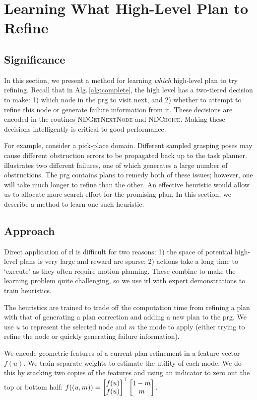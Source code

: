\section{Learning What High-Level Plan to Refine}
\subsection{Significance}
In this section, we present a method for learning \emph{which} high-level plan to try
refining. Recall that in Alg.\,\ref{alg:complete}, the high level has
a two-tiered decision to make: 1) which node in the {\sc prg} to visit
next, and 2) whether to attempt to refine this node or generate
failure information from it. These decisions are encoded in the
routines \textsc{NDGetNextNode} and \textsc{NDChoice}. Making these
decisions intelligently is critical to good performance. 

For example, consider a pick-place domain. Different sampled grasping
poses may cause different obstruction errors to be propagated back up to
the task planner.  illustrates two different
failures, one of which generates a large number of obstructions. The
{\sc prg} contains plans to remedy both of these issues; however, one
will take much longer to refine than the other. An effective heuristic
would allow us to allocate more search effort for the promising
plan. In this section, we describe a method to learn one such
heuristic.

\subsection{Approach}
Direct application of {\sc rl} is difficult for two reasons: 1) the
space of potential high-level plans is very large and reward are
sparse; 2) actions take a long time to `execute' as they often require
motion planning. These combine to make the learning problem quite
challenging, so we use {\sc irl} with expert demonstrations to
train heuristics.

The heuristics are trained to trade off the computation time from
refining a plan with that of generating a plan correction and adding a
new plan to the {\sc prg}. We use $u$ to represent the selected node
and $m$ the mode to apply (either trying to refine the node or
quickly generating failure information).

We encode geometric features of a current plan refinement in a feature
vector $f(u).$ We train separate weights to estimate the utility of
each mode. We do this by stacking two copies of the features and using
an indicator to zero out the top or bottom half: $f((u, m))
= \begin{bmatrix} f(u) \\ f(u) \end{bmatrix}^\top \begin{bmatrix} 1 -
  m \\ m \end{bmatrix}.\vspace{2pt}$ 

